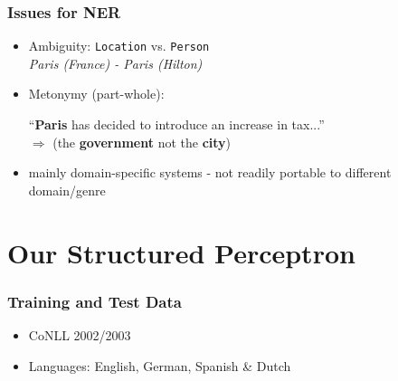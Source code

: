 \documentclass[10pt]{beamer}
\begin{document}
\begin{frame}
\frametitle{Issues for NER}

\begin{itemize}
 \item Ambiguity: \texttt{Location} vs. \texttt{Person} \\
 
 \emph{Paris (France) - Paris (Hilton)}\\
 
 \item Metonymy (part-whole):
 
 ``\textbf{Paris} has decided to introduce an increase in tax...'' \\
 
 $\Rightarrow$ (the \textbf{government} not the \textbf{city})  

 \item mainly domain-specific systems - not readily portable to different domain/genre %
 
\end{itemize}

\end{frame}



\section{Our Structured Perceptron}
\begin{frame}
\frametitle{Training and Test Data}

\begin{itemize}
 \item CoNLL 2002/2003 
 \item Languages: English, German, Spanish \& Dutch
\end{itemize}
\end{frame}




\begin{frame}
\frametitle{}
\end{frame}
\end{document}
